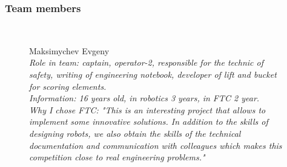 \subsubsection{Team members}
\begin{figure}[H]
	\begin{minipage}[h]{0.47\linewidth}
		\\		
	\end{minipage}
	\hfill
	\begin{minipage}[h]{0.47\linewidth}
		Maksimychev Evgeny\\
		\emph{Role in team: captain, operator-2, responsible for the technic of safety,  writing of engineering notebook, developer of lift and bucket for scoring elements. \\}
		\emph{Information: 16 years old, in robotics 3 years, in FTC 2 year. \\}
		\emph{Why I chose FTC: "This is an interesting project that allows to implement some innovative solutions. In addition to the skills of designing robots, we also obtain the skills of the technical documentation and communication with colleagues which makes this competition close to real engineering problems."}	
	\end{minipage}
\end{figure}

